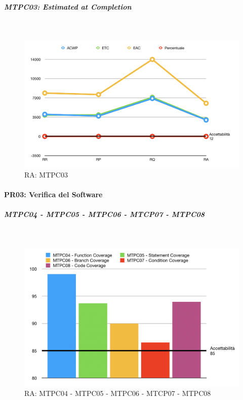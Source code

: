 \subparagraph{MTPC03: Estimated at Completion}  \-\\

\begin{figure}[H]
	\begin{center}
		\includegraphics[scale=0.5]{./images/grafici_RA/MTPC03.png} 
		\caption{RA: MTPC03}
	\end{center}
\end{figure}

\paragraph{PR03: Verifica del Software}

\subparagraph{MTPC04 - MTPC05 - MTPC06 - MTCP07 - MTPC08}  \-\\

\begin{figure}[H]
	\begin{center}
		\includegraphics[scale=0.5]{./images/grafici_RA/PR03.png} 
		\caption{RA: MTPC04 - MTPC05 - MTPC06 - MTCP07 - MTPC08}
	\end{center}
\end{figure}

